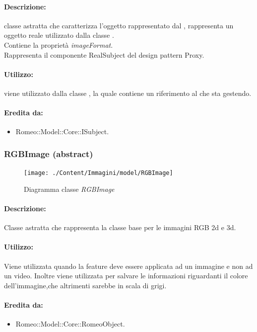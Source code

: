 	\paragraph{Descrizione:} classe astratta che caratterizza l’oggetto rappresentato dal , rappresenta un oggetto reale utilizzato dalla classe .
\\Contiene la proprietà \emph{imageFormat}.
\\Rappresenta il componente RealSubject del design pattern\g{} Proxy.
	\paragraph{Utilizzo:} viene utilizzato dalla classe , la quale contiene un riferimento al  che sta gestendo.
	\paragraph{Eredita da:}
		\begin{itemize}
			\item Romeo::Model::Core::ISubject.
		\end{itemize}
	\subsubsection{RGBImage (abstract)}
	\begin{figure}[!h]
		\centering
		\texttt{[image: ./Content/Immagini/model/RGBImage]}
		\caption{Diagramma classe \textsl{RGBImage}}
	\end{figure}
	\paragraph{Descrizione:} Classe astratta che rappresenta la classe base per le immagini RGB 2d e 3d.
	\paragraph{Utilizzo:} Viene utilizzata quando la feature\g{} deve essere applicata ad un immagine e non ad un video.
Inoltre viene utilizzata per salvare le informazioni riguardanti il colore dell'immagine,che altrimenti sarebbe in scala di grigi.
	\paragraph{Eredita da:}
		\begin{itemize}
			\item Romeo::Model::Core::RomeoObject.
		\end{itemize}
